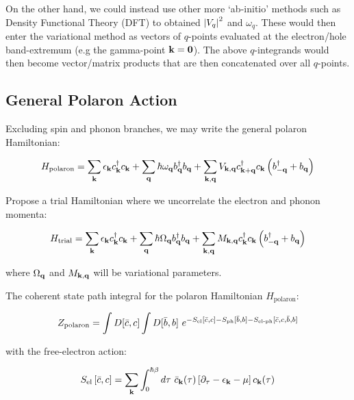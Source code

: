On the other hand, we could instead use other more `ab-initio' methods such as Density Functional Theory (DFT) to obtained $\abs{V_q}^2$ and $\omega_q$. These would then enter the variational method as vectors of $q$-points evaluated at the electron/hole band-extremum (e.g the gamma-point $\vb{k} = \vb{0}$). The above $q$-integrands would then become vector/matrix products that are then concatenated over all $q$-points.

\subsection{General Polaron Action}

Excluding spin and phonon branches, we may write the general polaron Hamiltonian:

\begin{equation}
    H_{\text{polaron}} = \sum_{\vb{k}} \epsilon_{\vb{k}} c^\dagger_{\vb{k}} c_{\vb{k}} + \sum_{\vb{q}} \hbar \omega_{\vb{q}} b^\dagger_{\vb{q}} b_{\vb{q}} + \sum_{\vb{k}, \vb{q}} V_{\vb{k},\vb{q}} c^\dagger_{\vb{k}+\vb{q}}c_{\vb{k}} \left( b^\dagger_{-\vb{q}} + b_{\vb{q}} \right)
\end{equation}

Propose a trial Hamiltonian where we uncorrelate the electron and phonon momenta:

\begin{equation}
    H_{\text{trial}} = \sum_{\vb{k}} \epsilon_{\vb{k}} c^\dagger_{\vb{k}} c_{\vb{k}} + \sum_{\vb{q}} \hbar \Omega_{\vb{q}} b^\dagger_{\vb{q}} b_{\vb{q}} + \sum_{\vb{k}, \vb{q}} M_{\vb{k},\vb{q}} c^\dagger_{\vb{k}}c_{\vb{k}} \left( b^\dagger_{-\vb{q}} + b_{\vb{q}} \right)
\end{equation}

where $\Omega_{\vb{q}}$ and $M_{\vb{k}, \vb{q}}$ will be variational parameters.

The coherent state path integral for the polaron Hamiltonian $H_{\text{polaron}}$:

\begin{equation}
    Z_{\text{polaron}} = \int D[\Bar{c}, c] \int D[\Bar{b},b]\ e^{-S_{\text{el}}[\Bar{c}, c] - S_{\text{ph}}[\Bar{b},b] - S_{\text{el-ph}}[\Bar{c},c,\Bar{b},b]}
\end{equation}

with the free-electron action:

\begin{equation}
        S_{\text{el}}\left[\Bar{c}, c\right] =  \sum_{\vb{k}} \int_0^{\hbar\beta} d\tau\ \Bar{c}_{\vb{k}}(\tau) \left[\partial_{\tau} - \epsilon_{\vb{k}} - \mu \right] c_{\vb{k}}(\tau)
\end{equation}

